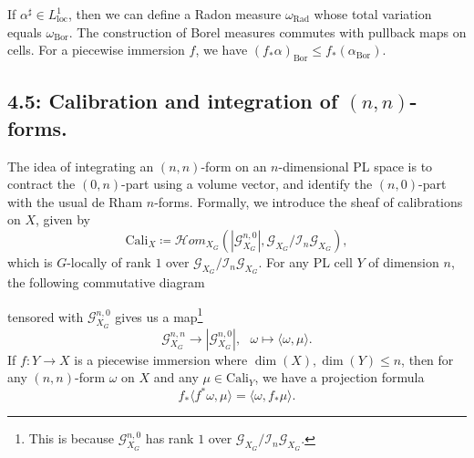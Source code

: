 \documentclass[12pt,reqno]{amsart}
\theoremstyle{definition}
\theoremstyle{remark}
\theoremstyle{citedrem}
\theoremstyle{cited}
\theoremstyle{citeddef}
\theoremstyle{step}
\begin{document}
If $\alpha^{\sharp} \in L^1_{\mathrm{loc}}$, then we can define a Radon measure $\omega_{\mathrm{Rad}}$ whose total variation equals $\omega_{\mathrm{Bor}}$. The construction of Borel measures commutes with pullback maps on cells. For a piecewise immersion $f$, we have $(f_*\alpha)_{\mathrm{Bor}} \leq f_*(\alpha_{\mathrm{Bor}}).$


\subsection*{4.5: Calibration and integration of $(n,n)$-forms.}
The idea of integrating an $(n,n)$-form on an $n$-dimensional PL space is to contract the $(0,n)$-part using a volume vector, and identify the $(n,0)$-part with the usual de Rham $n$-forms. Formally, we introduce the sheaf of calibrations on $X$, given by \[\mathrm{Cali}_X \coloneqq \mathcal{H}om_{X_G}(|\mathcal{G}^{n,0}_{X_G}|, \mathcal{G}_{X_G} / \mathcal{I}_n \mathcal{G}_{X_G}),\] which is $G$-locally of rank $1$ over $\mathcal{G}_{X_G} / \mathcal{I}_n \mathcal{G}_{X_G}$. For any PL cell $Y$ of dimension $n$, the following commutative diagram 

\begin{center}
\end{center}
tensored with $\mathcal{G}^{n,0}_{X_G}$ gives us a map\footnote{This is because $\mathcal{G}^{n,0}_{X_G}$ has rank $1$ over $\mathcal{G}_{X_G} / \mathcal{I}_n \mathcal{G}_{X_G}$.} \[\mathcal{G}^{n,n}_{X_G} \to |\mathcal{G}^{n,0}_{X_G}|,\ \ \  \omega \mapsto \langle \omega, \mu\rangle.\] If $f \colon Y \to X$ is a piecewise immersion where $\dim(X), \dim(Y) \leq n$, then for any $(n,n)$-form $\omega$ on $X$ and any $\mu \in \mathrm{Cali}_Y$, we have a projection formula \[f_*\langle f^* \omega, \mu \rangle = \langle \omega, f_* \mu \rangle.\]
\end{document}
